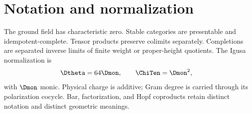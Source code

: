 \documentclass[11pt,twoside,openright]{memoir}
\begin{document}
\chapter*{Notation and normalization}
The ground field has characteristic zero.  Stable categories are presentable and idempotent-complete.  Tensor products preserve colimits separately.  Completions are separated inverse limits of finite weight or proper-height quotients.  The Igusa normalization is
\[
 \Dtheta=64\Dmon,\qquad \ChiTen=\Dmon^2,
\]
with $\Dmon$ monic.  Physical charge is additive; Gram degree is carried through its polarization cocycle.  Bar, factorization, and Hopf coproducts retain distinct notation and distinct geometric meanings.

\tableofcontents
\mainmatter









\backmatter


\end{document}
